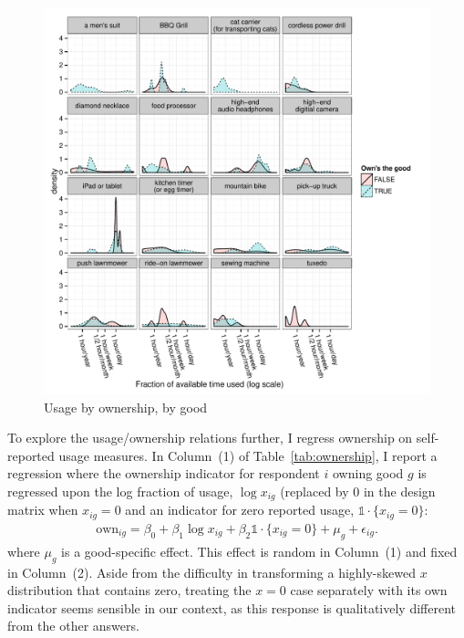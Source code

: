 \documentclass[11pt]{article}
\begin{document}
\begin{figure}
\centering 
\caption{Usage by ownership, by good \label{fig:ownership_distro}}
\begin{minipage}{0.90 \linewidth}
\includegraphics[width = \linewidth]{./plots/ownership_distro.pdf} 
\end{minipage} 
\end{figure} 

To explore the usage/ownership relations further, I regress ownership on self-reported usage measures. 
In Column~(1) of Table~\ref{tab:ownership}, I report a regression where the ownership indicator for respondent $i$ owning good $g$  is regressed upon the log fraction of usage, $\log x_{ig}$ (replaced by $0$ in the design matrix when $x_{ig} = 0$ and an indicator for zero reported usage, $\mathbb{1}\cdot\{x_{ig} = 0\}$:  
\begin{align} \label{eq:base_own}
\mbox{own}_{ig} = \beta_0 + \beta_1 \log x_{ig} + \beta_2 \mathbb{1}\cdot\{x_{ig} = 0\} + \mu_{g} + \epsilon_{ig}.
\end{align} 
where $\mu_g$ is a good-specific effect. 
This effect is random in Column~(1) and fixed in Column~(2).
Aside from the difficulty in transforming a highly-skewed $x$ distribution that contains zero, treating the $x = 0$ case separately with its own indicator seems sensible in our context, as this response is qualitatively different from the other answers. 
\end{document}
